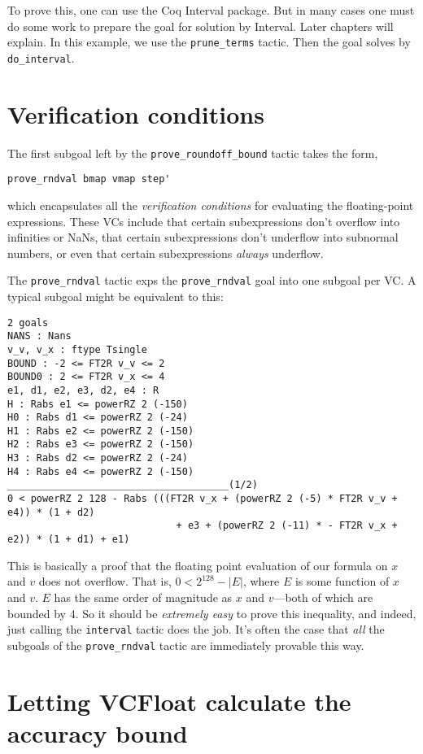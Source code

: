 \documentclass[article]{memoir}
\begin{document}
To prove this, one can use the Coq Interval package.  But in many
cases one must do some work to prepare the goal for solution by
Interval.  Later chapters will explain.
In this example, we use the \lstinline{prune_terms} tactic.
Then the goal solves by \lstinline{do_interval}.

\chapter{Verification conditions}
\label{goal1}
The first subgoal left by the \lstinline{prove_roundoff_bound} tactic
takes the form,
\begin{lstlisting}
prove_rndval bmap vmap step'
\end{lstlisting}
which encapsulates all the \emph{verification conditions} for
evaluating the floating-point expressions.  These VCs include that
certain subexpressions don't overflow into infinities or NaNs,
that certain subexpressions don't underflow into subnormal numbers,
or even that certain subexpressions \emph{always} underflow.

The \lstinline{prove_rndval} tactic exps 
the \lstinline{prove_rndval} goal into one subgoal per VC.
A typical subgoal might be equivalent to this:

\begin{lstlisting}
2 goals
NANS : Nans
v_v, v_x : ftype Tsingle
BOUND : -2 <= FT2R v_v <= 2
BOUND0 : 2 <= FT2R v_x <= 4
e1, d1, e2, e3, d2, e4 : R
H : Rabs e1 <= powerRZ 2 (-150)
H0 : Rabs d1 <= powerRZ 2 (-24)
H1 : Rabs e2 <= powerRZ 2 (-150)
H2 : Rabs e3 <= powerRZ 2 (-150)
H3 : Rabs d2 <= powerRZ 2 (-24)
H4 : Rabs e4 <= powerRZ 2 (-150)
______________________________________(1/2)
0 < powerRZ 2 128 - Rabs (((FT2R v_x + (powerRZ 2 (-5) * FT2R v_v + e4)) * (1 + d2)
                             + e3 + (powerRZ 2 (-11) * - FT2R v_x + e2)) * (1 + d1) + e1)
\end{lstlisting}

This is basically a proof that the floating point evaluation
of our formula on $x$ and $v$ does not
overflow.  That is, $0 < 2^{128}-|E|$, where
$E$ is some function of $x$ and $v$.
$E$ has the same order of magnitude as $x$ and $v$---both of which are bounded
by 4.   So it should be \emph{extremely easy} to prove this
inequality, and indeed, just calling the \lstinline{interval}
tactic does the job.  It's often the case that \emph{all} the
subgoals of the \lstinline{prove_rndval} tactic are
immediately provable this way.

\chapter{Letting VCFloat calculate the accuracy bound}
\end{document}
